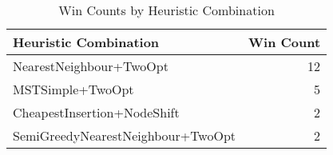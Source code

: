 \begin{table}[htbp]
\caption{Win Counts by Heuristic Combination}
\label{tab:win_counts}
\begin{tabular}{lr}
\toprule
Heuristic Combination & Win Count \\
\midrule
NearestNeighbour+TwoOpt & 12 \\
MSTSimple+TwoOpt & 5 \\
CheapestInsertion+NodeShift & 2 \\
SemiGreedyNearestNeighbour+TwoOpt & 2 \\
\bottomrule
\end{tabular}
\end{table}
